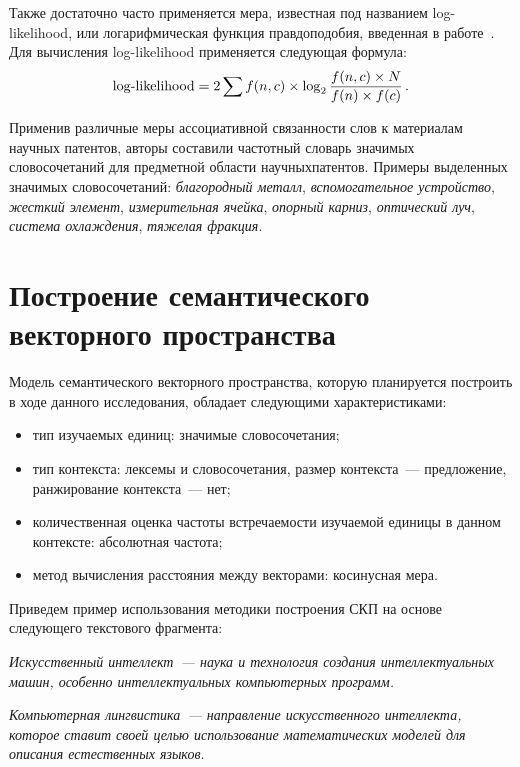 \begin{multicols}{2}
     Также достаточно часто применяется мера, известная под названием 
log-likelihood, или логарифмическая функция правдоподобия, введенная в\linebreak 
работе~\cite{15-mor}. Для вычисления log-likelihood применяется 
следующая формула:
     $$
     \mathrm{log}\mbox{-}\mathrm{likelihood}=2\sum f(n,c)\times 
\log_2\displaystyle\frac{\displaystyle f(n,c)\times N\mathstrut}{\displaystyle f(n)\times f(c)\mathstrut}\,.
     $$

Применив различные меры ассоциативной связанности слов к материалам 
научных патентов, авторы составили частотный словарь значимых 
словосочетаний для предметной области научных\linebreak патентов. Примеры 
выделенных значимых словосочетаний: \textit{благородный металл}, 
\textit{вспомогательное устройство}, \textit{жесткий элемент}, 
\textit{измерительная ячейка}, \textit{опорный карниз}, \textit{оптический 
луч}, \textit{система охлаж\-де\-ния}, \textit{тяжелая фракция}.

\section{Построение семантического векторного пространства}

Модель семантического векторного пространства, которую планируется 
построить в ходе данного исследования, обладает следующими 
характеристиками:
\begin{itemize}
\item тип изучаемых единиц: значимые словосочетания;
\item тип контекста: лексемы и словосочетания, размер контекста~--- 
предложение, ранжирование контекста~--- нет;
\item количественная оценка частоты встречаемости изучаемой единицы в 
данном контексте: абсолютная частота;
\item метод вычисления расстояния между векторами: косинусная мера.
\end{itemize}

Приведем пример использования методики построения СКП на основе 
следующего текстового фрагмента:

\noindent
\textit{Искусственный интеллект~--- наука и технология создания 
интеллектуальных машин, особенно интеллектуальных компьютерных 
программ.}

\noindent
\textit{Компьютерная лингвистика~--- направление искусственного 
интеллекта, которое ставит своей целью использование математических 
моделей для описания естественных языков}. 


\end{multicols}
